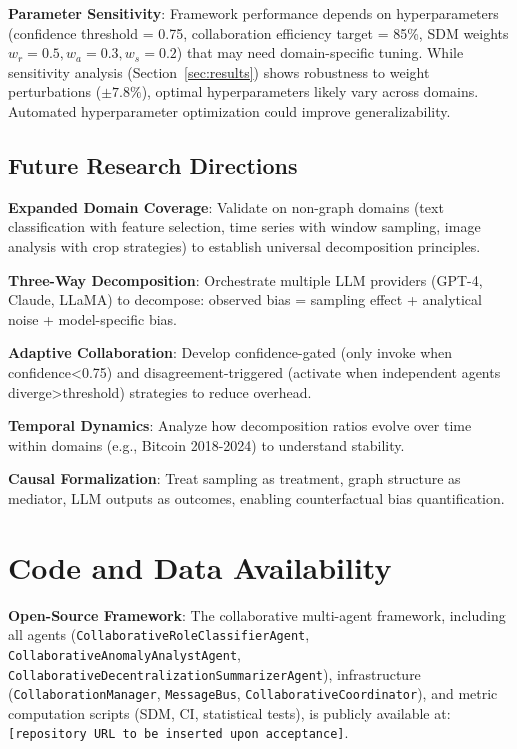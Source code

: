 \documentclass[conference]{IEEEtran}
\begin{document}
\textbf{Parameter Sensitivity}: Framework performance depends on hyperparameters (confidence threshold = 0.75, collaboration efficiency target = 85\%, SDM weights $w_r=0.5, w_a=0.3, w_s=0.2$) that may need domain-specific tuning. While sensitivity analysis (Section~\ref{sec:results}) shows robustness to weight perturbations ($\pm 7.8\%$), optimal hyperparameters likely vary across domains. Automated hyperparameter optimization could improve generalizability.

\subsection{Future Research Directions}

\textbf{Expanded Domain Coverage}: Validate on non-graph domains (text classification with feature selection, time series with window sampling, image analysis with crop strategies) to establish universal decomposition principles.

\textbf{Three-Way Decomposition}: Orchestrate multiple LLM providers (GPT-4, Claude, LLaMA) to decompose: observed bias = sampling effect + analytical noise + model-specific bias.

\textbf{Adaptive Collaboration}: Develop confidence-gated (only invoke when confidence<0.75) and disagreement-triggered (activate when independent agents diverge>threshold) strategies to reduce overhead.

\textbf{Temporal Dynamics}: Analyze how decomposition ratios evolve over time within domains (e.g., Bitcoin 2018-2024) to understand stability.

\textbf{Causal Formalization}: Treat sampling as treatment, graph structure as mediator, LLM outputs as outcomes, enabling counterfactual bias quantification.

\section{Code and Data Availability}\label{sec:availability}

\textbf{Open-Source Framework}: The collaborative multi-agent framework, including all agents (\texttt{CollaborativeRoleClassifierAgent}, \texttt{CollaborativeAnomalyAnalystAgent}, \texttt{CollaborativeDecentralizationSummarizerAgent}), infrastructure (\texttt{CollaborationManager}, \texttt{MessageBus}, \texttt{CollaborativeCoordinator}), and metric computation scripts (SDM, CI, statistical tests), is publicly available at: \texttt{[repository URL to be inserted upon acceptance]}.
\end{document}
